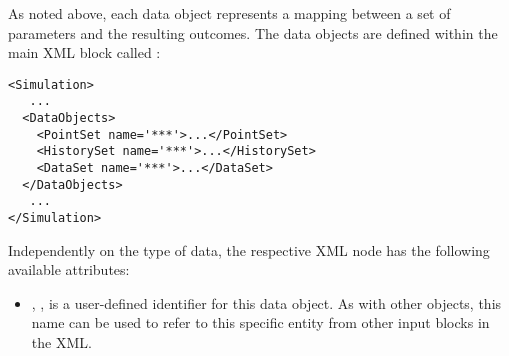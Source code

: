 As noted above, each data object represents a mapping between a set of
parameters and the resulting outcomes.
%
The data objects are defined within the main XML block called :
\begin{lstlisting}[style=XML]
<Simulation>
   ...
  <DataObjects>
    <PointSet name='***'>...</PointSet>
    <HistorySet name='***'>...</HistorySet>
    <DataSet name='***'>...</DataSet>
  </DataObjects>
   ...
</Simulation>
\end{lstlisting}

Independently on the type of data, the respective XML node has the following
available attributes:
\vspace{-5mm}
\begin{itemize}
  \itemsep0em
  \item {}, , is a user-defined
  identifier for this data object.
  \nb As with other objects, this name can be used to refer to this specific
  entity from other input blocks in the XML.


\end{itemize}
